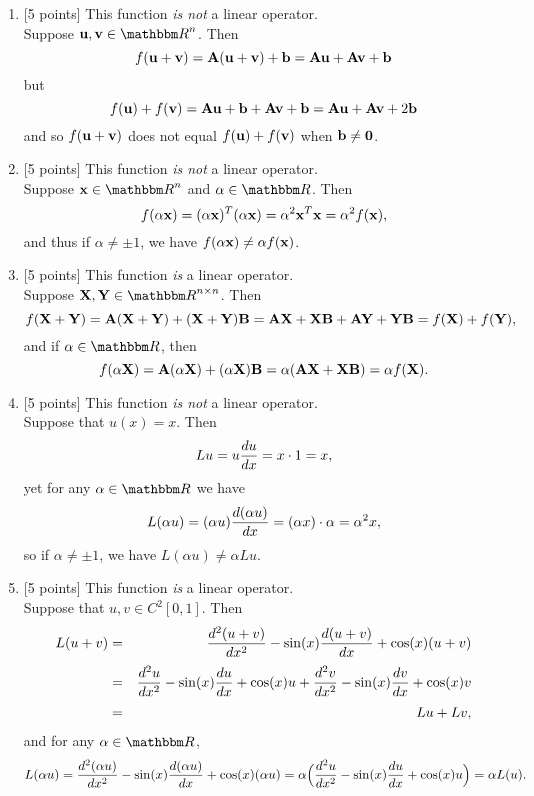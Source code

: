 \begin{solution}
\begin{enumerate}
\item {[5 points]} This function \emph{is not} a linear operator.\\
Suppose $\Bu, \Bv \in \Rn$.  Then 
\[
f({\bf u}+{\bf v}) = {\bf A}({\bf u}+{\bf v}) + {\bf b}  = {\bf A}{\bf u} + {\bf A}{\bf v} + {\bf b}
\]
but
\[
f({\bf u})+f({\bf v}) = {\bf A}{\bf u} + {\bf b} + {\bf A}{\bf v} + {\bf b} = {\bf A}{\bf u} + {\bf A}{\bf v} + 2{\bf b}
\]
and so $f({\bf u}+{\bf v})$ does not equal $f({\bf u}) + f({\bf v})$ when ${\bf b}\ne {\bf 0}$.

\item {[5 points]} This function \emph{is not} a linear operator.\\
      Suppose $\Bx\in \Rn$ and $\alpha\in\R$.  Then 
             \[ f(\alpha{\bf x}) = (\alpha {\bf x})^T(\alpha {\bf x}) 
                             = \alpha^2 {\bf x}^T{\bf x} 
                             = \alpha^2 f({\bf x}),\]
      and thus if $\alpha \ne \pm 1$, we have $f(\alpha {\bf x}) \ne \alpha f({\bf x})$.

\item {[5 points]} This function \emph{is} a linear operator.\\
      Suppose $\BX, \BY \in \Rnn$.  Then 
            \[ f({\bf X}+{\bf Y}) = {\bf A}({\bf X}+{\bf Y}) + ({\bf X}+{\bf Y}){\bf B}
                          = {\bf A}{\bf X} + {\bf X} {\bf B} + {\bf A}{\bf Y} + {\bf Y}{\bf B}
                          = f({\bf X}) + f({\bf Y}),\]
      and if $\alpha\in\R$, then
            \[ f(\alpha {\bf X}) = {\bf A}(\alpha{\bf X}) + (\alpha {\bf X}) {\bf B}
                             = \alpha ({\bf A}{\bf X} + {\bf X}{\bf B})
                             = \alpha f({\bf X}).\]

\item {[5 points]} This function \emph{is not} a linear operator.\\
      Suppose that $u(x) = x$.  Then 
          \[ Lu = u {d u \over dx} = x \cdot 1 = x,\]
      yet for any $\alpha \in \R$ we have
          \[ L(\alpha u) = (\alpha u) {d (\alpha u) \over dx}
                         = (\alpha x) \cdot \alpha = \alpha^2 x,\]
      so if $\alpha \ne \pm 1$, we have $L(\alpha u) \ne \alpha L u$.

\item {[5 points]} This function \emph{is} a linear operator.\\
      Suppose that $u, v \in C^2[0,1]$.  Then 
        \begin{eqnarray*}
               L(u+v) &=& {d^2(u+v) \over dx^2} - \sin(x) {d(u+v) \over dx} 
                           + \cos(x) (u+v)  \\[0.25em]
                  &=& {d^2 u \over dx^2} - \sin(x) {du \over dx} + \cos(x) u
                  + {d^2 v \over dx^2} - \sin(x) {dv \over dx} + \cos(x) v \\[0.25em]
                  &=& Lu + Lv,
        \end{eqnarray*}
      and for any $\alpha \in \R$,
        \[ L(\alpha u) = {d^2 (\alpha u) \over dx^2} - \sin(x) {d(\alpha u) \over dx} + \cos(x) (\alpha u) 
                       = \alpha \Big({d^2 u \over dx^2} - \sin(x) {du \over dx} + \cos(x) u\Big) = \alpha L(u).\]
\end{enumerate}
\end{solution}